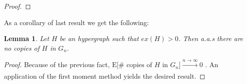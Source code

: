 \documentclass[12pt,notitlepage,a4paper]{article}
\newtheorem{lemma}{Lemma}[section]
\theoremstyle{definition}
\newcommand{\N}{\mathbb{N}}
\newcommand{\Ln}{\lim\limits_{n\to \infty}}
\begin{document}
\begin{proof}
\end{proof}

As a corollary of last result we get the following:  
\begin{lemma} \label{lem:nocopiesdense}
	Let $H$ be an hypergraph such that $ex(H)>0$. Then
	a.a.s there are no copies of $H$ in $G_n$. 
\end{lemma}  
\begin{proof}
	Because of the previous fact, 
	$\mathrm{E}\big[\# \text{ copies of }H \text{ in } G_n\big] 
	\xrightarrow[]{n\to \infty} 0$ . An application of the first moment
	method yields the desired result. 
\end{proof} 
\end{document}
